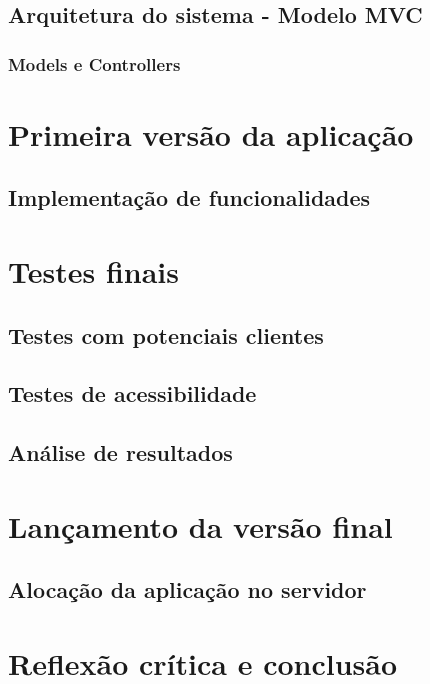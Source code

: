 \documentclass[11pt, twoside]{report}
\begin{document}
	\section{Arquitetura do sistema - Modelo MVC}
	\subsection{Models e Controllers}
	
	\chapter{Primeira versão da aplicação}
	\section{Implementação de funcionalidades}
	
	\chapter{Testes finais}
	\section{Testes com potenciais clientes}
	\section{Testes de acessibilidade}
	\section{Análise de resultados}
	
	\chapter{Lançamento da versão final}
	\section{Alocação da aplicação no servidor}
	
	
	\chapter{Reflexão crítica e conclusão}
	
	

	
	
	
\end{document}
